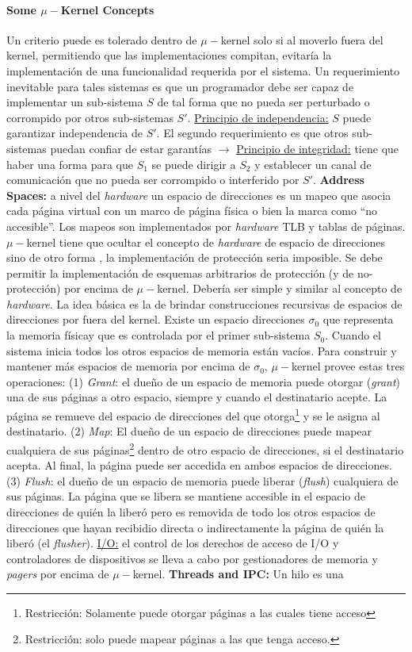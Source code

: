 \paragraph{\textnormal{\textbf{Some $\mu-$Kernel Concepts}}} 
Un criterio puede es tolerado dentro de $\mu-$kernel solo si al moverlo fuera del kernel, permitiendo que las implementaciones compitan, evitaría la implementación de una funcionalidad requerida por el sistema. Un requerimiento inevitable para tales sistemas es que un programador debe ser capaz de implementar un sub-sistema $S$ de tal forma que no pueda ser perturbado o corrompido por otros sub-sistemas $S'$. \underline{Principio de independencia:} $S$ puede garantizar independencia de $S'$. El segundo requerimiento es que otros sub-sistemas puedan confiar de estar garantías $\rightarrow$ \underline{Principio de integridad:} tiene que haber una forma para que $S_1$ se puede dirigir a $S_2$ y establecer un canal de comunicación que no pueda ser corrompido o interferido por $S'$. \textbf{Address Spaces:} a nivel del \textit{hardware} un espacio de direcciones es un mapeo que asocia cada página virtual con un marco de página física o bien la marca como ``no accesible''. Los mapeos son implementados por \textit{hardware} TLB y tablas de páginas. $\mu-$kernel tiene que ocultar el concepto de \textit{hardware} de espacio de direcciones sino de otro forma , la implementación de protección seria imposible. Se debe permitir la implementación de esquemas arbitrarios de protección (y de no-protección) por encima de $\mu-$kernel. Debería ser simple y similar al concepto de \textit{hardware}. La idea básica es la de brindar construcciones recursivas de espacios de direcciones por fuera del kernel. Existe un espacio direcciones $\sigma_0$ que representa la memoria físicay que es controlada por el primer sub-sistema $S_0$. Cuando el sistema inicia todos los otros espacios de memoria están vacíos. Para construir y mantener más espacios de memoria por encima de $\sigma_0$, $\mu-$kernel provee estas tres operaciones: (1) \textit{Grant}: el dueño de un espacio de memoria puede otorgar (\textit{grant}) una de sus páginas a otro espacio, siempre y cuando el destinatario acepte. La página se remueve del espacio de direcciones del que otorga\footnote{Restricción: Solamente puede otorgar páginas a las cuales tiene acceso} y se le asigna al destinatario. (2) \textit{Map}: El dueño de un espacio de direcciones puede mapear cualquiera de sus páginas\footnote{Restricción: solo puede mapear páginas a las que tenga acceso.} dentro de otro espacio de direcciones, si el destinatario acepta. Al final, la página puede ser accedida en ambos espacios de direcciones. (3) \textit{Flush}: el dueño de un espacio de memoria puede liberar (\textit{flush}) cualquiera de sus páginas. La página que se libera se mantiene accesible in el espacio de direcciones de quién la liberó pero es removida de todo los otros espacios de direcciones que hayan recibidio directa o indirectamente la página de quién la liberó (el \textit{flusher}). \underline{I/O:} el control de los derechos de acceso de I/O y controladores de dispositivos se lleva a cabo por gestionadores de memoria y \textit{pagers} por encima de $\mu-$kernel. \textbf{Threads and IPC:} Un hilo es una 